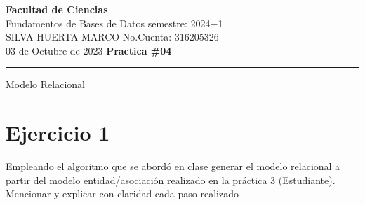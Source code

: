 \documentclass[a4paper,12pt]{article}
\begin{document}
\pagecolor{black}
\color{white}

\thispagestyle{firstpage} %
\noindent
\large\textbf{Facultad de Ciencias} \\
Fundamentos de Bases de Datos \hfill semestre: 2024$-$1 \\
\textsc{SILVA HUERTA MARCO}   \hfill No.Cuenta: 316205326    \\
03 de Octubre de 2023      \hfill \textbf{Practica \#04}    \\
\noindent\rule{7.3in}{2.8pt}

\begin{center}
\textcolor{sun}{\Large{Modelo Relacional}}
\end{center}

\section*{Ejercicio 1}
\textcolor{sun}{Empleando el algoritmo que se abordó en clase generar el modelo
relacional a partir del modelo entidad/asociación realizado en la práctica 3 (Estudiante). Mencionar y explicar con claridad cada paso realizado}
\end{document}
